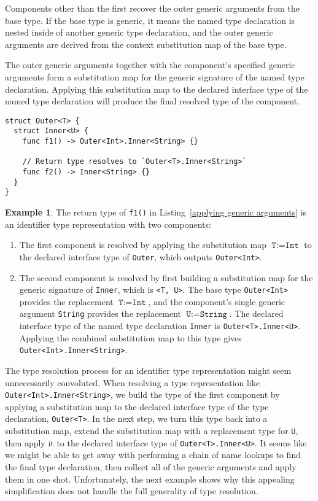\documentclass[a4paper,headsepline,bibliography=totoc,toc=flat,fleqn,twoside=semi]{scrbook}
\theoremstyle{definition}
\theoremstyle{definition}
\newtheorem{example}{Example}[chapter]
\theoremstyle{definition}
\begin{document}
Components other than the first recover the outer generic arguments from the base type. If the base type is generic, it means the named type declaration is nested inside of another generic type declaration, and the outer generic arguments are derived from the context substitution map of the base type.

The outer generic arguments together with the component's specified generic arguments form a substitution map for the generic signature of the named type declaration. Applying this substitution map to the declared interface type of the named type declaration will produce the final resolved type of the component.

\begin{listing}\label{applying generic arguments}
\begin{Verbatim}
struct Outer<T> {
  struct Inner<U> {
    func f1() -> Outer<Int>.Inner<String> {}

    // Return type resolves to `Outer<T>.Inner<String>`
    func f2() -> Inner<String> {}
  }
}
\end{Verbatim}
\end{listing}
\begin{example} The return type of \texttt{f1()} in Listing~\ref{applying generic arguments} is an identifier type representation with two components:
\begin{enumerate}
\item The first component is resolved by applying the substitution map $\texttt{T}:=\texttt{Int}$ to the declared interface type of \texttt{Outer}, which outputs \texttt{Outer<Int>}.
\item The second component is resolved by first building a substitution map for the generic signature of \texttt{Inner}, which is \texttt{<T,~U>}. The base type \texttt{Outer<Int>} provides the replacement $\texttt{T}:=\texttt{Int}$, and the component's single generic argument \texttt{String} provides the replacement $\texttt{U}:=\texttt{String}$. The declared interface type of the named type declaration \texttt{Inner} is \texttt{Outer<T>.Inner<U>}. Applying the combined substitution map to this type gives \texttt{Outer<Int>.Inner<String>}.
\end{enumerate}

\end{example}

The type resolution process for an identifier type representation might seem unnecessarily convoluted. When resolving a type representation like \texttt{Outer<Int>.Inner<String>}, we build the type of the first component by applying a substitution map to the declared interface type of the type declaration, \texttt{Outer<T>}. In the next step, we turn this type back into a substitution map, extend the substitution map with a replacement type for \texttt{U}, then apply it to the declared interface type of \texttt{Outer<T>.Inner<U>}. It seems like we might be able to get away with performing a chain of name lookups to find the final type declaration, then collect all of the generic arguments and apply them in one shot. Unfortunately, the next example shows why this appealing simplification does not handle the full generality of type resolution.
\end{document}
